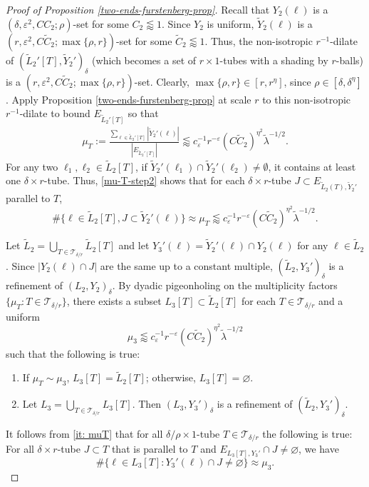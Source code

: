 \documentclass{amsart}
\numberwithin{equation}{section}
\newcommand{\de}{\delta}
\newcommand{\e}{\varepsilon}
\newcommand{\la}{\lambda}
\newcommand{\cT}{{\mathcal T}}
\begin{document}
\begin{proof}[Proof of Proposition \ref{two-ends-furstenberg-prop}]
Recall that $Y_2(\ell)$ is a $(\de,\e^2,CC_2;\rho)$-set for some $C_2\lessapprox1$.
Since $Y_2$ is uniform, $\tilde Y_2(\ell)$ is a $(r,\e^2,C\tilde C_2;\max\{\rho,r\})$-set for some $\tilde C_2\lessapprox1$.
Thus, the non-isotropic $r^{-1}$-dilate of $(\tilde L_2'[T], \tilde Y_2')_\de$ (which becomes a set of $r\times1$-tubes with a shading by $r$-balls) 
is a $(r,\e^2,C\tilde C_2;\max\{\rho,r\})$-set.
Clearly, $\max\{\rho,r\}\in[r,r^\eta]$, since $\rho\in[\de,\de^\eta]$.
Apply Proposition \ref{two-ends-furstenberg-prop} at scale $r$ to this non-isotropic $r^{-1}$-dilate to bound $E_{\tilde L_2'[T]}$ so that
\begin{align}
\label{mu-T-step2}
    \mu_T:=\frac{\sum_{\ell\in \tilde L_2'[T]}|\tilde Y_2'(\ell)|}{|E_{\tilde L_2'[T]}|}\lessapprox c_\e^{-1} r^{-\e}(C\tilde C_2)^{\eta^2} \tilde\la^{-1/2}.
\end{align}
For any two $\ell_1,\ell_2\in \tilde L_2[T]$, if $\tilde Y_2'(\ell_1)\cap \tilde Y_2'(\ell_2)\neq \emptyset$, it contains at least one $\de\times r$-tube. 
Thus, \eqref{mu-T-step2} shows that for each $\de\times r$-tube $J\subset E_{\tilde L_2( T), \tilde Y_2'}$ parallel to $T$, 
\begin{equation} \label{it: muT}
    \#\{\ell\in \tilde L_2[T], J\subset \tilde Y_2'(\ell)\}\approx\mu_T\lessapprox c_\e^{-1} r^{-\e}(C\tilde C_2)^{\eta^2} \tilde\la^{-1/2}.
\end{equation}



Let $\tilde L_2=\bigcup_{T\in\cT_{\delta/r}}\tilde L_2[T]$ and let $Y_3'(\ell)=\tilde Y_2'(\ell)\cap Y_2(\ell)$ for any $\ell\in \tilde L_2$. 
Since $|Y_2(\ell)\cap J|$ are the same up to a constant multiple, $(\tilde L_2,Y_3')_\de$ is a refinement of  $(L_2,Y_2)_\de$.
By dyadic pigeonholing on the multiplicity factors $\{\mu_T: T\in\cT_{\de/r}\}$,  there exists a subset $L_3[T]\subset\tilde L_2[T]$ for each $T\in\cT_{\de/r}$ and a uniform
\begin{equation}
\label{small-multi-assumption}
    \mu_3\lessapprox c_\e^{-1} r^{-\e}(C\tilde C_2)^{\eta^2} \tilde\la^{-1/2}
\end{equation}
such that the following is true:
\begin{enumerate}
    \item If $\mu_T\sim\mu_3$, $L_3[T]=\tilde L_2[T]$; otherwise, $L_3[T]=\varnothing$. 
    \item Let $L_3=\bigcup_{T\in\cT_{\de/r}}L_3[T]$. Then $(L_3,Y_3')_\de$ is a refinement of $(\tilde L_2,Y_3')_\de$.
\end{enumerate}
It follows from \eqref{it: muT} that for all $\de/\rho\times1$-tube $T\in\cT_{\de/r}$ the following is true: 
For all $\delta \times r$-tube $J\subset T$ that is parallel to  $T$ and $ E_{L_3[T], Y_3'}\cap J\neq \varnothing$, we have  
\begin{equation}
\label{uniform-multi-assumption-pre}
    \#\{\ell\in L_3[T]:  Y_3'(\ell)\cap J\not=\varnothing\}\approx\mu_3.
\end{equation}



\end{proof}
\end{document}
